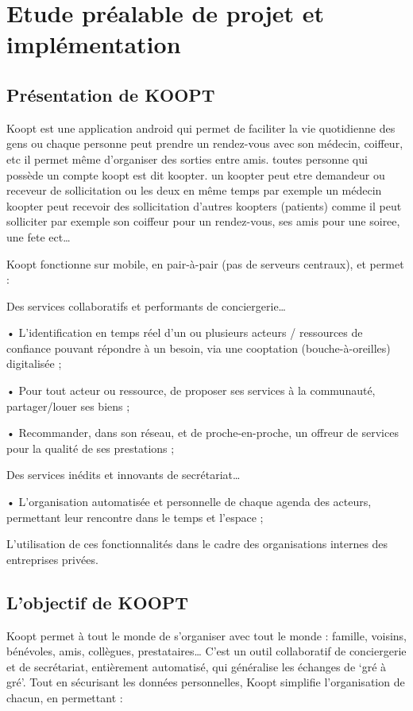 \chapter{Etude préalable de projet et implémentation}
\label{sec:etude préalable de projet et implémentation}

\section{Présentation de KOOPT}
Koopt est une application android qui permet de faciliter la vie quotidienne des gens ou chaque personne peut prendre un rendez-vous avec son médecin, coiffeur, etc il permet même d'organiser des sorties entre amis.
toutes personne qui possède un compte koopt est dit koopter. un koopter peut etre demandeur ou receveur de sollicitation ou les deux en même temps par exemple un médecin koopter peut recevoir des sollicitation d’autres koopters (patients) comme il peut solliciter par exemple son coiffeur pour un rendez-vous,  ses amis pour une soiree, une fete ect…
 
Koopt fonctionne sur mobile, en pair-à-pair (pas de serveurs centraux), et permet :

Des services collaboratifs et performants de conciergerie… 

• L’identification en temps réel d’un ou plusieurs acteurs / ressources de confiance pouvant répondre à un besoin, via une cooptation (bouche-à-oreilles) digitalisée ; 

• Pour tout acteur ou ressource, de proposer ses services à la communauté, partager/louer ses biens ; 

• Recommander, dans son réseau, et de proche-en-proche, un offreur de services pour la qualité de ses prestations ;  
 
Des services inédits et innovants de secrétariat…

• L’organisation automatisée et personnelle de chaque agenda des acteurs, permettant leur rencontre dans le temps et l’espace ; 
 
 L’utilisation de ces fonctionnalités dans le cadre des organisations internes des entreprises privées.


\section{L’objectif de KOOPT}

Koopt permet à tout le monde de s’organiser avec tout le monde : famille, voisins, bénévoles, amis, collègues, prestataires… C’est un outil collaboratif de conciergerie et de secrétariat, entièrement automatisé, qui généralise les échanges de ‘gré à gré’. Tout en sécurisant les données personnelles, Koopt simplifie l’organisation de chacun, en permettant :

